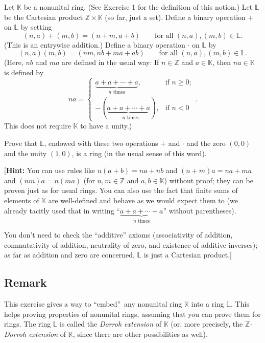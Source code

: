 \documentclass[paper=a4, fontsize=12pt]{scrartcl}%
\theoremstyle{plainsl}
\theoremstyle{definition}
\theoremstyle{remark}
\begin{document}
Let $\mathbb{K}$ be a nonunital ring. (See Exercise 1 for the definition of
this notion.) Let $\mathbb{L}$ be the Cartesian product $\mathbb{Z}
\times\mathbb{K}$ (so far, just a set). Define a binary operation $+$ on
$\mathbb{L}$ by setting
\[
\left(  n, a \right)  + \left(  m, b \right)  = \left(  n+m, a+b \right)
\qquad\text{for all } \left(  n, a \right)  , \left(  m, b \right)
\in\mathbb{L} .
\]
(This is an entrywise addition.) Define a binary operation $\cdot$ on
$\mathbb{L}$ by
\[
\left(  n, a \right)  \left(  m, b \right)  = \left(  nm, nb + ma + ab
\right)  \qquad\text{for all } \left(  n, a \right)  , \left(  m, b \right)
\in\mathbb{L} .
\]
(Here, $nb$ and $ma$ are defined in the usual way: If $n \in\mathbb{Z}$ and $a
\in\mathbb{K}$, then $na \in\mathbb{K}$ is defined by
\[
na=
\begin{cases}
\underbrace{a+a+\cdots+a}_{n \text{ times}}, & \text{if } n \geq0;\\
- \left(  \underbrace{a+a+\cdots+a}_{-n \text{ times}} \right)  , & \text{if }
n < 0
\end{cases}
.
\]
This does not require $\mathbb{K}$ to have a unity.)

Prove that $\mathbb{L}$, endowed with these two operations $+$ and $\cdot$ and
the zero $\left(  0, 0 \right)  $ and the unity $\left(  1, 0 \right)  $, is a
ring (in the usual sense of this word).

[\textbf{Hint:} You can use rules like $n \left(  a + b \right)  = na + nb$
and $\left(  n + m \right)  a = na + ma$ and $\left(  nm \right)  a = n
\left(  ma \right)  $ (for $n, m \in\mathbb{Z}$ and $a, b \in\mathbb{K}$)
without proof; they can be proven just as for usual rings. You can also use
the fact that finite sums of elements of $\mathbb{K}$ are well-defined and
behave as we would expect them to (we already tacitly used that in writing
``$\underbrace{a+a+\cdots+a}_{n \text{ times}}$'' without parentheses).

You don't need to check the ``additive'' axioms (associativity of addition,
commutativity of addition, neutrality of zero, and existence of additive
inverses); as far as addition and zero are concerned, $\mathbb{L}$ is just a
Cartesian product.]

\subsection{Remark}

This exercise gives a way to \textquotedblleft embed\textquotedblright\ any
nonunital ring $\mathbb{K}$ into a ring $\mathbb{L}$. This helps proving
properties of nonunital rings, assuming that you can prove them for rings. The
ring $\mathbb{L}$ is called the \textit{Dorroh extension} of $\mathbb{K}$ (or,
more precisely, the $\mathbb{Z}$\textit{-Dorroh extension} of $\mathbb{K}$,
since there are other possibilities as well).
\end{document}
